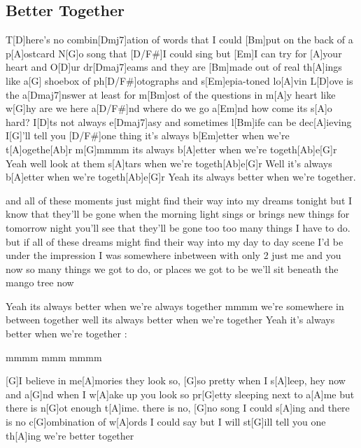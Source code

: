 \subsection*{Better Together   }
\begin{guitar}
T[D]here's no combin[Dmj7]ation of words that I could [Bm]put on the back of a p[A]ostcard
N[G]o song that [D/F#]I could sing but [Em]I can try for [A]your heart and
O[D]ur dr[Dmaj7]eams and they are [Bm]made out of real th[A]ings like
a[G] shoebox of ph[D/F#]otographs and s[Em]epia-toned lo[A]vin
L[D]ove is the a[Dmaj7]nswer at least for m[Bm]ost of the questions in m[A]y heart like
w[G]hy are we here a[D/F#]nd where do we go a[Em]nd how come its s[A]o hard? 
I[D]ts not always e[Dmaj7]asy and sometimes l[Bm]ife can be dec[A]ieving
I[G]'ll tell you [D/F#]one thing it's always b[Em]etter when we're t[A]ogethe[Ab]r 
m[G]mmmm its always b[A]etter when we're togeth[Ab]e[G]r
Yeah well look at them s[A]tars when we're togeth[Ab]e[G]r 
Well it's always b[A]etter when we're togeth[Ab]e[G]r
Yeah its always better when we're together.

and all of these moments just might find their way into my dreams tonight 
but I know that they'll be gone when the morning light sings or brings new things 
for tomorrow night you'll see that they'll be gone too too many things I have to do.
 but if all of these dreams might find their way into my day to day scene 
I'd be under the impression I was somewhere inbetween with only 2 just me and you 
now so many things we got to do, or places we got to be we'll sit beneath the mango tree now

Yeah its always better when we're always together 
mmmm we're somewhere in between together 
well its always better when we're together 
Yeah it's always better when we're together :

mmmm mmm mmmm

[G]I believe in me[A]mories they look so, [G]so pretty when I s[A]leep, hey now and
a[G]nd when I w[A]ake up you look so pr[G]etty sleeping next to a[A]me but there is 
n[G]ot enough t[A]ime. there is no, [G]no song I could s[A]ing and there is no 
c[G]ombination of w[A]ords I could say but I will st[G]ill tell you one th[A]ing we're better together
\end{guitar}
